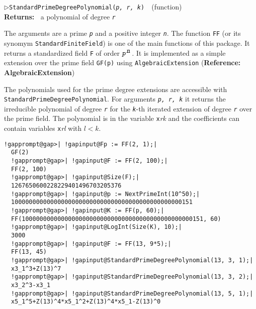 \documentclass[a4paper,11pt]{report}
\begin{document}
{{{\noindent\textcolor{FuncColor}{$\triangleright$\enspace\texttt{StandardPrimeDegreePolynomial({\mdseries\slshape p, r, k})
\label{StandardPrimeDegreePolynomial}
}\hfill{\scriptsize (function)}}\\
\textbf{\indent Returns:\ }
a polynomial of degree \mbox{\texttt{\mdseries\slshape r}}



 The arguments are a prime \mbox{\texttt{\mdseries\slshape p}} and a positive integer \mbox{\texttt{\mdseries\slshape n}}. The function \texttt{FF} (or its synomym \texttt{StandardFiniteField}) is one of the main functions of this package. It returns a standardized
field \texttt{F} of order $\mbox{\texttt{\mdseries\slshape p}}^{\mbox{\texttt{\mdseries\slshape n}}}$. It is implemented as a simple extension over the prime field \texttt{GF(p)} using \texttt{AlgebraicExtension} (\textbf{Reference: AlgebraicExtension}) 

 The polynomials used for the prime degree extensions are accessible with \texttt{StandardPrimeDegreePolynomial}. For arguments \mbox{\texttt{\mdseries\slshape p, r, k}} it returns the irreducible polynomial of degree \mbox{\texttt{\mdseries\slshape r}} for the \mbox{\texttt{\mdseries\slshape k}}-th iterated extension of degree \mbox{\texttt{\mdseries\slshape r}} over the prime field. The polynomial is in the variable \texttt{x}\emph{r}\texttt{{\textunderscore}}\emph{k} and the coefficients can contain variables \texttt{x}\emph{r}\texttt{{\textunderscore}}\emph{l} with $l < k$. 

 
\begin{Verbatim}[commandchars=!@|,fontsize=\small,frame=single,label=Example]
  !gapprompt@gap>| !gapinput@Fp := FF(2, 1);|
  GF(2)
  !gapprompt@gap>| !gapinput@F := FF(2, 100);|
  FF(2, 100)
  !gapprompt@gap>| !gapinput@Size(F);|
  1267650600228229401496703205376
  !gapprompt@gap>| !gapinput@p := NextPrimeInt(10^50);|
  100000000000000000000000000000000000000000000000151
  !gapprompt@gap>| !gapinput@K := FF(p, 60);|
  FF(100000000000000000000000000000000000000000000000151, 60)
  !gapprompt@gap>| !gapinput@LogInt(Size(K), 10);|
  3000
  !gapprompt@gap>| !gapinput@F := FF(13, 9*5);|
  FF(13, 45)
  !gapprompt@gap>| !gapinput@StandardPrimeDegreePolynomial(13, 3, 1);|
  x3_1^3+Z(13)^7
  !gapprompt@gap>| !gapinput@StandardPrimeDegreePolynomial(13, 3, 2);|
  x3_2^3-x3_1
  !gapprompt@gap>| !gapinput@StandardPrimeDegreePolynomial(13, 5, 1);|
  x5_1^5+Z(13)^4*x5_1^2+Z(13)^4*x5_1-Z(13)^0
\end{Verbatim}
 }

}}
\end{document}
